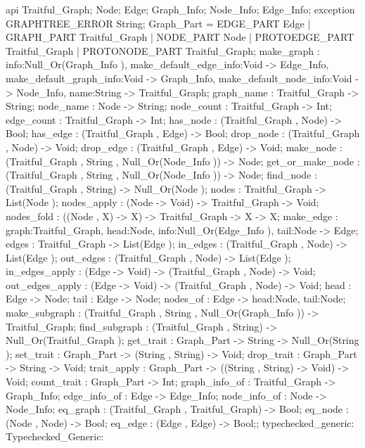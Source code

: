 api {
    Traitful_Graph;
    Node;
    Edge;
    Graph_Info;
    Node_Info;
    Edge_Info;
    exception GRAPHTREE_ERROR String;
        Graph_Part
        = EDGE_PART
        Edge
        |
        GRAPH_PART
        Traitful_Graph
        |
        NODE_PART
        Node
        |
        PROTOEDGE_PART
        Traitful_Graph
        |
        PROTONODE_PART
        Traitful_Graph;
        make_graph :
                {info:Null_Or(Graph_Info ), make_default_edge_info:Void -> Edge_Info,
                make_default_graph_info:Void -> Graph_Info, make_default_node_info:Void -> Node_Info, name:String}
            ->
            Traitful_Graph;
    graph_name : Traitful_Graph -> String;
    node_name : Node -> String;
    node_count : Traitful_Graph -> Int;
    edge_count : Traitful_Graph -> Int;
    has_node : (Traitful_Graph , Node) -> Bool;
    has_edge : (Traitful_Graph , Edge) -> Bool;
    drop_node : (Traitful_Graph , Node) -> Void;
    drop_edge : (Traitful_Graph , Edge) -> Void;
    make_node : (Traitful_Graph , String , Null_Or(Node_Info )) -> Node;
    get_or_make_node : (Traitful_Graph , String , Null_Or(Node_Info )) -> Node;
    find_node : (Traitful_Graph , String) -> Null_Or(Node );
    nodes : Traitful_Graph -> List(Node );
    nodes_apply : (Node -> Void) -> Traitful_Graph -> Void;
    nodes_fold : ((Node , X) -> X) -> Traitful_Graph -> X -> X;
    make_edge : {graph:Traitful_Graph, head:Node, info:Null_Or(Edge_Info ), tail:Node} -> Edge;
    edges : Traitful_Graph -> List(Edge );
    in_edges : (Traitful_Graph , Node) -> List(Edge );
    out_edges : (Traitful_Graph , Node) -> List(Edge );
    in_edges_apply : (Edge -> Void) -> (Traitful_Graph , Node) -> Void;
    out_edges_apply : (Edge -> Void) -> (Traitful_Graph , Node) -> Void;
    head : Edge -> Node;
    tail : Edge -> Node;
    nodes_of : Edge -> {head:Node, tail:Node};
    make_subgraph : (Traitful_Graph , String , Null_Or(Graph_Info )) -> Traitful_Graph;
    find_subgraph : (Traitful_Graph , String) -> Null_Or(Traitful_Graph );
    get_trait : Graph_Part -> String -> Null_Or(String );
    set_trait : Graph_Part -> (String , String) -> Void;
    drop_trait : Graph_Part -> String -> Void;
    trait_apply : Graph_Part -> ((String , String) -> Void) -> Void;
    count_trait : Graph_Part -> Int;
    graph_info_of : Traitful_Graph -> Graph_Info;
    edge_info_of : Edge -> Edge_Info;
    node_info_of : Node -> Node_Info;
    eq_graph : (Traitful_Graph , Traitful_Graph) -> Bool;
    eq_node : (Node , Node) -> Bool;
    eq_edge : (Edge , Edge) -> Bool;};
typechecked_generic:
Typechecked_Generic:
